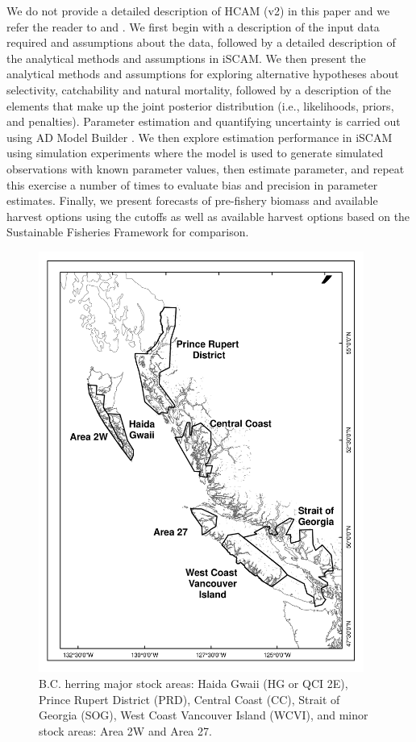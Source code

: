 We do not provide a detailed description of HCAM (v2) in this paper and we refer the reader to \cite{schweigert2009stock} and \cite{Clear2010}.  We first begin with a description of the input data required and assumptions about the data, followed by a detailed description of the analytical methods and assumptions in iSCAM. We then present the analytical methods and assumptions for exploring alternative hypotheses about selectivity, catchability and natural mortality, followed by a description of the elements that make up the joint posterior distribution (i.e., likelihoods, priors, and penalties).  Parameter estimation and quantifying uncertainty is carried out using AD Model Builder \citep{ADMB2009}.  We then explore estimation performance in iSCAM using simulation experiments where the model is used to generate simulated observations with known parameter values, then estimate parameter, and repeat this exercise a number of times to evaluate bias and precision in parameter estimates.  Finally, we present forecasts of pre-fishery biomass and available harvest options using the cutoffs \cite[e.g., reproduce Table 5 in ][]{Clear2010} as well as available harvest options based on the Sustainable Fisheries Framework \citep[i.e.,][]{dfo2006} for comparison.

\begin{figure}[!tbp]
	\includegraphics[width=0.95\textwidth]{../FIGS/PBSfigs/Assessment_Regions_2W_27_2010_HG.pdf}
	\caption{B.C. herring major stock areas: Haida Gwaii (HG or QCI 2E), Prince Rupert District (PRD), Central
Coast (CC), Strait of Georgia (SOG), West Coast Vancouver Island (WCVI), and minor stock areas: Area 2W and
Area 27.}\label{Fig1}
\end{figure}
	
